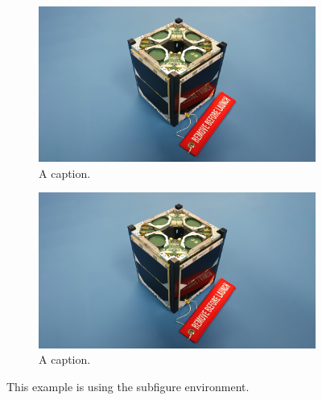 \begin{figure}[!htb]
	\vspace{0.4cm}

    \begin{subfigure}[t]{0.3\textwidth}
        \includegraphics[width=\linewidth]{images/istsat1.jpeg}
		\caption{A caption.}
    \end{subfigure}
	\hspace{0.05\textwidth}
    \begin{subfigure}[t]{0.3\textwidth}
        \includegraphics[width=\linewidth]{images/istsat1.jpeg}
		\caption{A caption.}
    \end{subfigure}

    \caption{This example is using the subfigure environment.}
	\label{fig:five_images}
\end{figure}